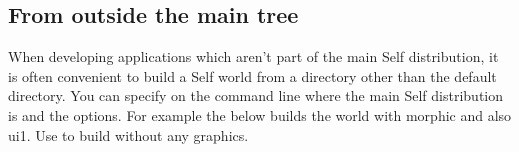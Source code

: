 \documentclass[letterpaper,10pt,english]{sphinxmanual}
\begin{document}
\subsection{From outside the main tree}
\label{\detokenize{buildworld:from-outside-the-main-tree}}
When developing applications which aren't part of the main Self distribution, it is often convenient to build a Self world from a directory other than the default directory. You can specify on the command line where the main Self distribution is and the options. For example the below builds the world with morphic and also ui1. Use  to build without any graphics.
\begin{quote}

\begin{sphinxVerbatim}[commandchars=\\\{\}]
      \PYGZbs{}
                             \PYGZbs{}
        
\end{sphinxVerbatim}
\end{quote}
\end{document}
